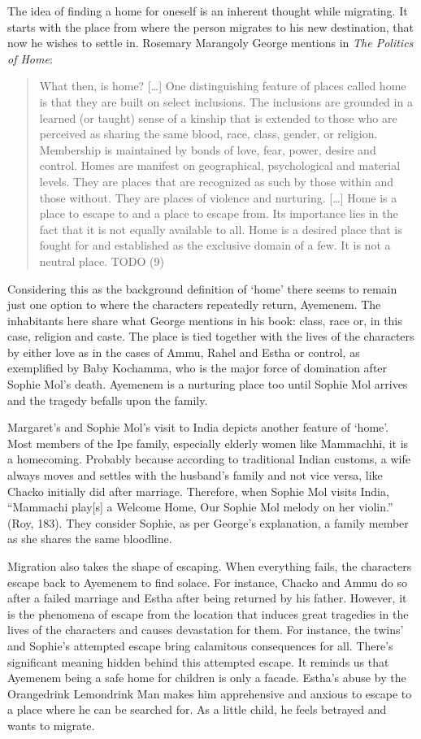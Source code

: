 The idea of finding a home for oneself is an inherent thought while migrating. It starts with the place from where the person migrates to his new destination, that now he wishes to settle in. Rosemary Marangoly George mentions in \emph{The Politics of Home}:

\begin{quote}
  What then, is home? […] One distinguishing feature of places called home is that they are built on select inclusions. The inclusions are grounded in a learned (or taught) sense of a kinship that is extended to those who are perceived as sharing the same blood, race, class, gender, or religion. Membership is maintained by bonds of love, fear, power, desire and control. Homes are manifest on geographical, psychological and material levels. They are places that are recognized as such by those within and those without. They are places of violence and nurturing. […] Home is a place to escape to and a place to escape from. Its importance lies in the fact that it is not equally available to all. Home is a desired place that is fought for and established as the exclusive domain of a few. It is not a neutral place. TODO (9) 
\end{quote}

Considering this as the background definition of ‘home’ there seems to remain just one option to where the characters repeatedly return, Ayemenem. The inhabitants here share what George mentions in his book: class, race or, in this case, religion and caste. The place is tied together with the lives of the characters by either love as in the cases of Ammu, Rahel and Estha or control, as exemplified by Baby Kochamma, who is the major force of domination after Sophie Mol’s death. Ayemenem is a nurturing place too until Sophie Mol arrives and the tragedy befalls upon the family. 

Margaret’s and Sophie Mol’s visit to India depicts another feature of ‘home’. Most members of the Ipe family, especially elderly women like Mammachhi, it is a homecoming. Probably because according to traditional Indian customs, a wife always moves and settles with the husband’s family and not vice versa, like Chacko initially did after marriage. Therefore, when Sophie Mol visits India, “Mammachi play[s] a Welcome Home, Our Sophie Mol melody on her violin.” (Roy, 183). They consider Sophie, as per George’s explanation, a family member as she shares the same bloodline. 

Migration also takes the shape of escaping. When everything fails, the characters escape back to Ayemenem to find solace. For instance, Chacko and Ammu do so after a failed marriage and Estha after being returned by his father. However, it is the phenomena of escape from the location that induces great tragedies in the lives of the characters and causes devastation for them. For instance, the twins’ and Sophie’s attempted escape bring calamitous consequences for all. There’s significant meaning hidden behind this attempted escape. It reminds us that Ayemenem being a safe home for children is only a facade. Estha’s abuse by the Orangedrink Lemondrink Man makes him apprehensive and anxious to escape to a place where he can be searched for. As a little child, he feels betrayed and wants to migrate.

